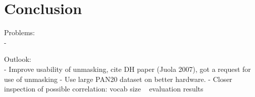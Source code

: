 \chapter{Conclusion}\label{conclusion}


Problems:\\
-

Outlook:\\
- Improve usability of unmasking, cite DH paper (Juola 2007), got a request for use of unmasking
- Use large PAN20 dataset on better hardware.
- Closer inspection of possible correlation: vocab size ~ evaluation results